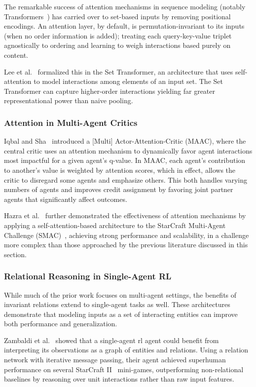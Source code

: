 The remarkable success of attention mechanisms in sequence modeling 
(notably Transformers~\cite{vaswani2017}) has carried over to set-based 
inputs by removing positional encodings. An attention layer, by default, 
is permutation-invariant to its inputs (when no order information is added); 
treating each query-key-value triplet agnostically to ordering and learning to 
weigh interactions based purely on content. 

Lee et al.~\cite{lee2019} 
formalized this in the Set Transformer, an architecture that uses 
self-attention to model interactions among elements of an input set. 
The Set Transformer can capture higher-order interactions
yielding far greater representational power than naive pooling. 

\subsubsection{Attention in Multi-Agent Critics}
Iqbal and Sha~\cite{iqbal2019} introduced a [Multi] Actor-Attention-Critic (MAAC), 
where the central critic uses an attention mechanism to dynamically 
favor agent interactions most impactful for a given agent's \Gls{q}-value. 
In MAAC, each agent's contribution to another's value is weighted by attention scores, 
which in effect, allows the critic to disregard some agents and emphasize others. 
This both handles varying numbers of agents and improves credit assignment by 
favoring joint partner agents that significantly affect outcomes. 

Hazra et al.~\cite{hazra2024} further demonstrated the effectiveness 
of attention mechanisms by applying a self-attention-based architecture 
to the StarCraft Multi-Agent Challenge (SMAC)~\cite{samvelyan2019}, 
achieving strong performance and scalability,
in a challenge more complex than those approached by the previous 
literature discussed in this section.

\subsubsection{Relational Reasoning in Single-Agent RL}
While much of the prior work focuses on multi-agent settings, 
the benefits of invariant relations extend to single-agent tasks as well. 
These architectures demonstrate that modeling inputs as a set of 
interacting entities can improve both performance and generalization.

Zambaldi et al.~\cite{zambaldi2018} showed that a single-agent \gls{rl} agent could 
benefit from interpreting its observations as a graph of entities and relations. 
Using a relation network with iterative message passing, their agent achieved 
superhuman performance on several StarCraft II~\cite{vinyals2019} mini-games, 
outperforming non-relational baselines by reasoning over unit interactions 
rather than raw input features.

